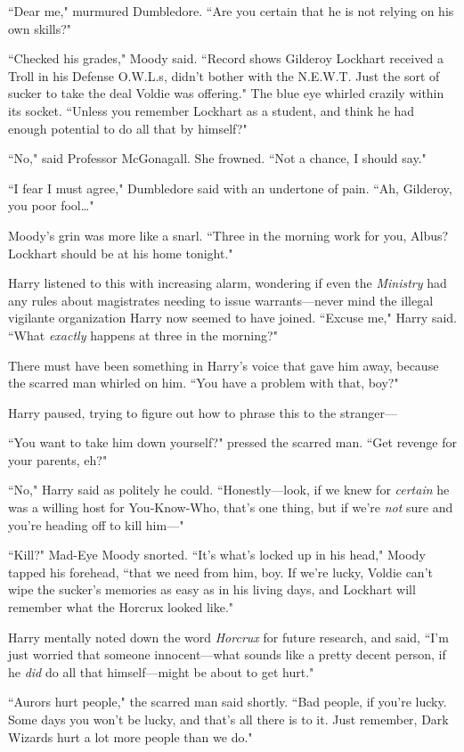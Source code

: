 ``Dear me," murmured Dumbledore. ``Are you certain that he is not relying on his own skills?"

``Checked his grades," Moody said. ``Record shows Gilderoy Lockhart received a Troll in his Defense O.W.L.s, didn't bother with the N.E.W.T. Just the sort of sucker to take the deal Voldie was offering." The blue eye whirled crazily within its socket. ``Unless you remember Lockhart as a student, and think he had enough potential to do all that by himself?"

``No," said Professor McGonagall. She frowned. ``Not a chance, I should say."

``I fear I must agree," Dumbledore said with an undertone of pain. ``Ah, Gilderoy, you poor fool{\ldots}"

Moody's grin was more like a snarl. ``Three in the morning work for you, Albus? Lockhart should be at his home tonight."

Harry listened to this with increasing alarm, wondering if even the \emph{Ministry} had any rules about magistrates needing to issue warrants—never mind the illegal vigilante organization Harry now seemed to have joined. ``Excuse me," Harry said. ``What \emph{exactly} happens at three in the morning?"

There must have been something in Harry's voice that gave him away, because the scarred man whirled on him. ``You have a problem with that, boy?"

Harry paused, trying to figure out how to phrase this to the stranger—

``You want to take him down yourself?" pressed the scarred man. ``Get revenge for your parents, eh?"

``No," Harry said as politely he could. ``Honestly—look, if we knew for \emph{certain} he was a willing host for You-Know-Who, that's one thing, but if we're \emph{not} sure and you're heading off to kill him—"

``Kill?" Mad-Eye Moody snorted. ``It's what's locked up in his head," Moody tapped his forehead, ``that we need from him, boy. If we're lucky, Voldie can't wipe the sucker's memories as easy as in his living days, and Lockhart will remember what the Horcrux looked like."

Harry mentally noted down the word \emph{Horcrux} for future research, and said, ``I'm just worried that someone innocent—what sounds like a pretty decent person, if he \emph{did} do all that himself—might be about to get hurt."

``Aurors hurt people," the scarred man said shortly. ``Bad people, if you're lucky. Some days you won't be lucky, and that's all there is to it. Just remember, Dark Wizards hurt a lot more people than we do."

